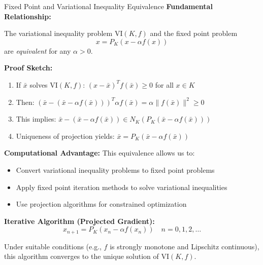 \documentclass[aspectratio=169,10pt]{beamer}
\begin{document}
\begin{frame}[allowframebreaks]{Fixed Point and Variational Inequality Equivalence}
  \textbf{Fundamental Relationship:}

  The variational inequality problem VI$(K, f)$ and the fixed point problem
  \[
  x = P_K(x - \alpha f(x))
  \]
  are \textit{equivalent} for any $\alpha > 0$.

  \vspace{0.5cm}

  \textbf{Proof Sketch:}
  \begin{enumerate}
    \item If $\bar{x}$ solves VI$(K, f)$: $(x - \bar{x})^T f(\bar{x}) \geq 0$ for all $x \in K$
    \item Then: $(\bar{x} - (\bar{x} - \alpha f(\bar{x})))^T \alpha f(\bar{x}) = \alpha \|f(\bar{x})\|^2 \geq 0$
    \item This implies: $\bar{x} - (\bar{x} - \alpha f(\bar{x})) \in N_K(P_K(\bar{x} - \alpha f(\bar{x})))$
    \item Uniqueness of projection yields: $\bar{x} = P_K(\bar{x} - \alpha f(\bar{x}))$
  \end{enumerate}

  \framebreak

  \textbf{Computational Advantage:} This equivalence allows us to:
  \begin{itemize}
    \item Convert variational inequality problems to fixed point problems
    \item Apply fixed point iteration methods to solve variational inequalities
    \item Use projection algorithms for constrained optimization
  \end{itemize}

  \vspace{0.5cm}

  \textbf{Iterative Algorithm (Projected Gradient):}
  \[
  x_{n+1} = P_K(x_n - \alpha f(x_n)) \quad n = 0, 1, 2, \ldots
  \]

  Under suitable conditions (e.g., $f$ is strongly monotone and Lipschitz continuous), this algorithm converges to the unique solution of VI$(K, f)$.
\end{frame}

\end{document}
